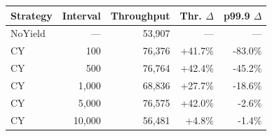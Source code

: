 \begin{tabular}{l r r r r}
\toprule
Strategy & Interval & Throughput & Thr. $\Delta$ & p99.9 $\Delta$ \\
\midrule
NoYield & --- & 53,907 & --- & --- \\
CY & 100 & 76,376 & +41.7\% & -83.0\% \\
CY & 500 & 76,764 & +42.4\% & -45.2\% \\
CY & 1,000 & 68,836 & +27.7\% & -18.6\% \\
CY & 5,000 & 76,575 & +42.0\% & -2.6\% \\
CY & 10,000 & 56,481 & +4.8\% & -1.4\% \\
\bottomrule
\end{tabular}
